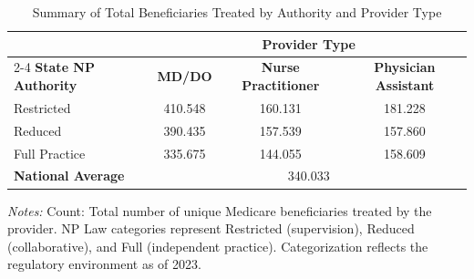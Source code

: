 \begin{table}[htbp]
    \centering
    \caption{Summary of Total Beneficiaries Treated by Authority and Provider Type}
    \label{tab:tot_benes}
    \vspace{0.2cm}
    \begin{tabular}{lccc}
        \toprule
        & \multicolumn{3}{c}{\textbf{Provider Type}} \\
        \cmidrule(lr){2-4}
        \textbf{State NP Authority} & \textbf{MD/DO} & \textbf{Nurse Practitioner} & \textbf{Physician Assistant} \\
        \midrule
        Restricted & 410.548 & 160.131 & 181.228 \\
        Reduced & 390.435 & 157.539 & 157.860 \\
        Full Practice & 335.675 & 144.055 & 158.609 \\
        \midrule
        \textbf{National Average} & \multicolumn{3}{c}{340.033} \\
        \bottomrule
    \end{tabular}
    \vspace{0.1cm}
    \begin{minipage}{0.85\textwidth}
        \footnotesize \textit{Notes:} Count: Total number of unique Medicare beneficiaries treated by the provider. NP Law categories represent Restricted (supervision), Reduced (collaborative), and Full (independent practice). Categorization reflects the regulatory environment as of 2023.
    \end{minipage}
\end{table}